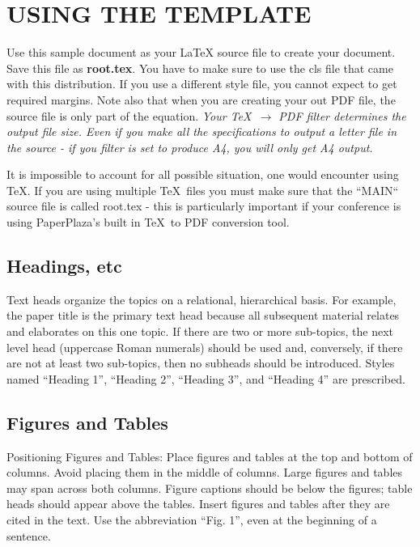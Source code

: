 \documentclass[letterpaper, 10 pt, conference]{ieeeconf}  %
\begin{document}
\section{USING THE TEMPLATE}

Use this sample document as your LaTeX source file to create your document. Save this file as {\bf root.tex}. You have to make sure to use the cls file that came with this distribution. If you use a different style file, you cannot expect to get required margins. Note also that when you are creating your out PDF file, the source file is only part of the equation. \emph{Your \TeX\ $\rightarrow$ PDF filter determines the output file size. Even if you make all the specifications to output a letter file in the source - if you filter is set to produce A4, you will only get A4 output.}

It is impossible to account for all possible situation, one would encounter using \TeX. If you are using multiple \TeX\ files you must make sure that the ``MAIN`` source file is called root.tex - this is particularly important if your conference is using PaperPlaza's built in \TeX\ to PDF conversion tool.

\subsection{Headings, etc}

Text heads organize the topics on a relational, hierarchical basis. For example, the paper title is the primary text head because all subsequent material relates and elaborates on this one topic. If there are two or more sub-topics, the next level head (uppercase Roman numerals) should be used and, conversely, if there are not at least two sub-topics, then no subheads should be introduced. Styles named ``Heading 1'', ``Heading 2'', ``Heading 3'', and ``Heading 4'' are prescribed.

\subsection{Figures and Tables}

Positioning Figures and Tables: Place figures and tables at the top and bottom of columns. Avoid placing them in the middle of columns. Large figures and tables may span across both columns. Figure captions should be below the figures; table heads should appear above the tables. Insert figures and tables after they are cited in the text. Use the abbreviation ``Fig. 1'', even at the beginning of a sentence.
\end{document}
